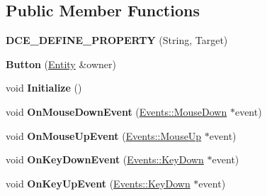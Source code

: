 \subsection*{Public Member Functions}
\begin{DoxyCompactItemize}
\item 
\hypertarget{classDCEngine_1_1Components_1_1Button_adda83c8f6f6f505fad15e0dd43acc5d3}{{\bfseries D\-C\-E\-\_\-\-D\-E\-F\-I\-N\-E\-\_\-\-P\-R\-O\-P\-E\-R\-T\-Y} (String, Target)}\label{classDCEngine_1_1Components_1_1Button_adda83c8f6f6f505fad15e0dd43acc5d3}

\item 
\hypertarget{classDCEngine_1_1Components_1_1Button_a468edecec2570f7cd69eb2d283c280d1}{{\bfseries Button} (\hyperlink{classDCEngine_1_1Entity}{Entity} \&owner)}\label{classDCEngine_1_1Components_1_1Button_a468edecec2570f7cd69eb2d283c280d1}

\item 
\hypertarget{classDCEngine_1_1Components_1_1Button_a1928a37df78c5c8f5f40f042838a8d65}{void {\bfseries Initialize} ()}\label{classDCEngine_1_1Components_1_1Button_a1928a37df78c5c8f5f40f042838a8d65}

\item 
\hypertarget{classDCEngine_1_1Components_1_1Button_ad37fcf19a03509021804b68735066e85}{void {\bfseries On\-Mouse\-Down\-Event} (\hyperlink{classDCEngine_1_1Events_1_1MouseDown}{Events\-::\-Mouse\-Down} $\ast$event)}\label{classDCEngine_1_1Components_1_1Button_ad37fcf19a03509021804b68735066e85}

\item 
\hypertarget{classDCEngine_1_1Components_1_1Button_a9b2a12675f2f4393c025dab4dffadfef}{void {\bfseries On\-Mouse\-Up\-Event} (\hyperlink{classDCEngine_1_1Events_1_1MouseUp}{Events\-::\-Mouse\-Up} $\ast$event)}\label{classDCEngine_1_1Components_1_1Button_a9b2a12675f2f4393c025dab4dffadfef}

\item 
\hypertarget{classDCEngine_1_1Components_1_1Button_a0aee8944548eb3fe1f1d633887d10b48}{void {\bfseries On\-Key\-Down\-Event} (\hyperlink{classDCEngine_1_1Events_1_1KeyDown}{Events\-::\-Key\-Down} $\ast$event)}\label{classDCEngine_1_1Components_1_1Button_a0aee8944548eb3fe1f1d633887d10b48}

\item 
\hypertarget{classDCEngine_1_1Components_1_1Button_a71717f0bd769c2e2fcad8eddf1422439}{void {\bfseries On\-Key\-Up\-Event} (\hyperlink{classDCEngine_1_1Events_1_1KeyDown}{Events\-::\-Key\-Down} $\ast$event)}\label{classDCEngine_1_1Components_1_1Button_a71717f0bd769c2e2fcad8eddf1422439}


\end{DoxyCompactItemize}
